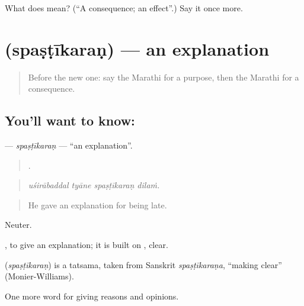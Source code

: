 \begin{tcolorbox}[breakable,colback=teal!4,colframe=teal!35!black,title={Before you move on}]
What does  mean? (\textquotedblleft{}A consequence; an effect\textquotedblright{}.) Say it once more.
\end{tcolorbox}
\section[\texorpdfstring{\mr{स्पष्टीकरण} (spaṣṭīkaraṇ)}{स्पष्टीकरण (spaṣṭīkaraṇ)}]{ (spaṣṭīkaraṇ) — an explanation}

\label{lesson:MR-C342-spastikaran}



\begin{quote}
Before the new one: say the Marathi for a purpose, then the Marathi for a consequence.
\end{quote}

\subsection*{You'll want to know: }
\textbf{} — \emph{spaṣṭīkaraṇ} — \textquotedblleft{}an explanation\textquotedblright{}.

\begin{quote}
   .
\end{quote}

\begin{quote}
\emph{uśirābaddal tyāne spaṣṭīkaraṇ dilaṁ.}
\end{quote}

\begin{quote}
He gave an explanation for being late.
\end{quote}

Neuter.

 , to give an explanation; it is built on , clear.

\begin{cousinweb}
\textbf{} (\emph{spaṣṭīkaraṇ}) is a tatsama, taken from Sanskrit \emph{spaṣṭīkaraṇa}, \textquotedblleft{}making clear\textquotedblright{} (Monier-Williams).
\end{cousinweb}

\begin{grammarlens}[title={What you've built}]
One more word for giving reasons and opinions.
\end{grammarlens}

